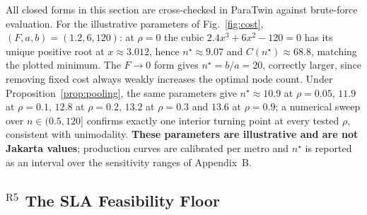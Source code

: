 \begin{remark}\label{rem:numval}
All closed forms in this section are cross-checked in ParaTwin against brute-force evaluation. For the illustrative parameters of Fig.~\ref{fig:cost}, $(F,a,b)=(1.2,6,120)$: at $\rho=0$ the cubic $2.4x^3+6x^2-120=0$ has its unique positive root at $x\approx3.012$, hence $n^\star\approx9.07$ and $C(n^\star)\approx68.8$, matching the plotted minimum. The $F\to0$ form gives $n^\star=b/a=20$, correctly larger, since removing fixed cost always weakly increases the optimal node count. Under Proposition~\ref{prop:pooling}, the same parameters give $n^\star\approx10.9$ at $\rho=0.05$, $11.9$ at $\rho=0.1$, $12.8$ at $\rho=0.2$, $13.2$ at $\rho=0.3$ and $13.6$ at $\rho=0.9$; a numerical sweep over $n\in(0.5,120]$ confirms exactly one interior turning point at every tested $\rho$, consistent with unimodality. \textbf{These parameters are illustrative and are not Jakarta values}; production curves are calibrated per metro and $n^\star$ is reported as an interval over the sensitivity ranges of Appendix~B.
\end{remark}

\subsection{$^{\mathrm{R5}}$ The SLA Feasibility Floor}


